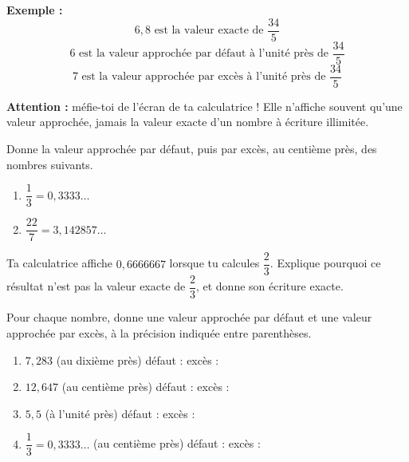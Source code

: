 \documentclass[../../syllabus_1.tex]{subfiles}
\begin{document}
\begin{itemize}
\textbf{Exemple :}
\begin{equation*}
    6,8 \text{ est la valeur exacte de } \dfrac{34}{5}
\end{equation*}
\begin{equation*}
    6 \text{ est la valeur approchée par défaut à l'unité près de } \dfrac{34}{5}
\end{equation*}
\begin{equation*}
    7 \text{ est la valeur approchée par excès à l'unité près de } \dfrac{34}{5}
\end{equation*}

\textbf{Attention :} méfie-toi de l'écran de ta calculatrice ! Elle n'affiche souvent qu'une valeur approchée, jamais la valeur exacte d'un nombre à écriture illimitée.

\begin{exercise}
    Donne la valeur approchée par défaut, puis par excès, au centième près, des nombres suivants.
    \begin{enumerate}[cols=2, itemsep=1.5cm]
        \item $\dfrac{1}{3} = 0{,}3333\dots$
        \item $\dfrac{22}{7} = 3{,}142857\dots$
    \end{enumerate}
\end{exercise}

\begin{exercise}
    Ta calculatrice affiche $0{,}6666667$ lorsque tu calcules $\dfrac{2}{3}$. Explique pourquoi ce résultat n'est pas la valeur exacte de $\dfrac{2}{3}$, et donne son écriture exacte.
    \vspace{2cm}
\end{exercise}

\begin{exercise}
    Pour chaque nombre, donne une valeur approchée par défaut et une valeur approchée par excès, à la précision indiquée entre parenthèses.
    \begin{enumerate}[itemsep=1cm]
        \item $7{,}283$ \quad (au dixième près) \qquad défaut : \dotfill \quad excès : \dotfill
        \item $12{,}647$ \quad (au centième près) \qquad défaut : \dotfill \quad excès : \dotfill
        \item $5{,}5$ \quad (à l'unité près) \qquad défaut : \dotfill \quad excès : \dotfill
        \item $\dfrac{1}{3} = 0{,}3333\dots$ \quad (au centième près) \qquad défaut : \dotfill \quad excès : \dotfill
    \end{enumerate}
\end{exercise}


\end{itemize}
\end{document}
